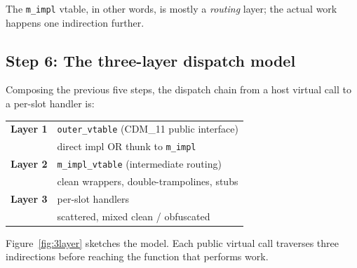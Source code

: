 \documentclass[11pt,letterpaper]{article}
\begin{document}
\noindent The \texttt{m\_impl} vtable, in other words, is mostly a
\emph{routing} layer; the actual work happens one indirection
further.

\subsection{Step 6: The three-layer dispatch model}
\label{sec:static-3layer}

Composing the previous five steps, the dispatch chain from a host
virtual call to a per-slot handler is:

\begin{center}
\small
\begin{tabular}{ll}
\textbf{Layer 1} & \texttt{outer\_vtable} (CDM\_11 public interface) \\
                 & \quad direct impl OR thunk to \texttt{m\_impl} \\
\textbf{Layer 2} & \texttt{m\_impl\_vtable} (intermediate routing) \\
                 & \quad clean wrappers, double-trampolines, stubs \\
\textbf{Layer 3} & per-slot handlers \\
                 & \quad scattered, mixed clean / obfuscated \\
\end{tabular}
\end{center}

\noindent Figure~\ref{fig:3layer} sketches the model.  Each public
virtual call traverses three indirections before reaching the
function that performs work.
\end{document}
